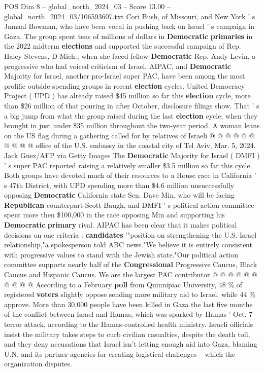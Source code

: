 \begin{textsample}{POS Dim 8 – global\_north\_2024\_03 – Score 13.00 – global\_north\_2024\_03/106593607.txt}
Cori Bush, of Missouri, and New York ' s Jamaal Bowman, who have been vocal in pushing back on Israel ' s campaign in Gaza.
The group spent tens of millions of dollars in \textbf{Democratic} \textbf{primaries} in the 2022 midterm \textbf{elections} and supported the successful campaign of Rep.
Haley Stevens, D-Mich., when she faced fellow \textbf{Democratic} Rep.
Andy Levin, a progressive who had voiced criticism of Israel.
AIPAC, and \textbf{Democratic} Majority for Israel, another pro-Israel super PAC, have been among the most prolific outside spending groups in recent \textbf{election} cycles.
United Democracy Project ( UPD ) has already raised \$45 million so far this \textbf{election} cycle, more than \$26 million of that pouring in after October, disclosure filings show.
That ' s a big jump from what the group raised during the last \textbf{election} cycle, when they brought in just under \$35 million throughout the two-year period.
A woman leans on the US flag during a gathering called for by relatives of Israeli @ @ @ @ @ @ @ @ @ @ office of the U.S. embassy in the coastal city of Tel Aviv, Mar. 5, 2024.
Jack Guez/AFP via Getty Images The \textbf{Democratic} Majority for Israel ( DMFI ) ' s super PAC reported raising a relatively smaller \$3.5 million so far this cycle.
Both groups have devoted much of their resources to a House race in California ' s 47th District, with UPD spending more than \$4.6 million unsuccessfully opposing \textbf{Democratic} California state Sen.
Dave Min, who will be facing \textbf{Republican} counterpart Scott Baugh, and DMFI ' s political action committee spent more then \$100,000 in the race opposing Min and supporting his \textbf{Democratic} \textbf{primary} rival.
AIPAC has been clear that it makes political decisions on one criteria : \textbf{candidates} '"position on strengthening the U.S.-Israel relationship,"a spokesperson told ABC news."We believe it is entirely consistent with progressive values to stand with the Jewish state."Our political action committee supports nearly half of the \textbf{Congressional} Progressive Caucus, Black Caucus and Hispanic Caucus.
We are the largest PAC contributor @ @ @ @ @ @ @ @ @ @ According to a February \textbf{poll} from Quinnipiac University, 48 \% of registered \textbf{voters} slightly oppose sending more military aid to Israel, while 44 \% approve.
More than 30,000 people have been killed in Gaza the last five months of the conflict between Israel and Hamas, which was sparked by Hamas ' Oct. 7 terror attack, according to the Hamas-controlled health ministry.
Israeli officials insist the military takes steps to curb civilian casualties, despite the death toll, and they deny accusations that Israel isn't letting enough aid into Gaza, blaming U.N. and its partner agencies for creating logistical challenges -- which the organization disputes.

\end{textsample}
